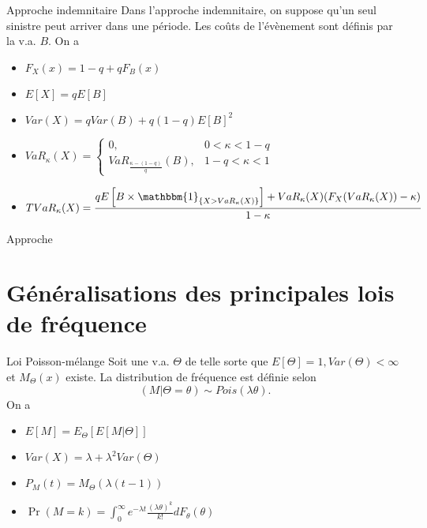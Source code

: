 \begin{definition}{Approche indemnitaire}{}
	Dans l'approche indemnitaire, on suppose qu'un seul sinistre peut arriver dans une période. Les coûts de l'évènement sont définis par la v.a. $B$. On a 
	
	
	\begin{itemize}
		\item $\displaystyle F_X(x) = 1-q + qF_B(x)$
		\item $\displaystyle E[X] = qE[B]$
		\item $\displaystyle Var(X) = qVar(B) + q(1-q)E[B]^2$
		\item $\displaystyle VaR_\kappa(X) = \begin{cases}
		0, & 0<\kappa<1-q\\
		VaR_{\frac{\kappa - (1-q)}{q}}(B), & 1-q<\kappa<1
		\end{cases}$
		\item $\displaystyle TVaR_\kappa(X) = \frac{qE\left[B\times \mathbbm{1}_{\{X > VaR_\kappa(X)\}}\right] + VaR_\kappa(X)(F_X(VaR_\kappa(X)) - \kappa)}{1 - \kappa}$
	\end{itemize}
\end{definition}

\begin{definition}{}{}
	Approche 
\end{definition}

\section{Généralisations des principales lois de fréquence}

\begin{definition}{Loi Poisson-mélange}{}
	Soit une v.a. $\Theta$ de telle sorte que $E[\Theta] = 1, Var(\Theta) < \infty$ et $M_\Theta(x)$ existe. La distribution de fréquence est définie selon
	$$(M\vert \Theta = \theta) \sim Pois(\lambda \theta).$$
	On a 
	\begin{itemize}
		\item $\displaystyle E[M] = E_\Theta[E[M \vert \Theta]]$
		\item $\displaystyle Var(X) = \lambda + \lambda^2 Var(\Theta)$
		\item $\displaystyle P_M(t) = M_\Theta(\lambda(t-1))$
		\item $\displaystyle \Pr(M = k) = \int_{0}^{\infty} e^{-\lambda t} \frac{(\lambda \theta)^k}{k!}dF_\theta(\theta)$
	\end{itemize}
\end{definition}

